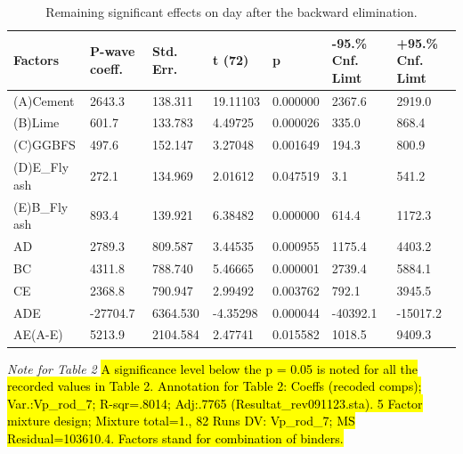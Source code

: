 \documentclass[materials,article,submit,pdftex,moreauthors]{Definitions/mdpi}
\begin{document}
\begin{table}[H]
\begin{threeparttable}
\caption{Remaining significant effects on day  after the backward elimination.}
\footnotesize
    \centering
    \begin{tabular}{|l|l|l|l|l|l|l|}
    \hline
        Factors & P-wave coeff. & Std. Err. & t (72) & p & -95.\% Cnf. Limt & +95.\% Cnf. Limt \\ \hline
        (A)Cement & 2643.3 & 138.311 & 19.11103 & 0.000000 & 2367.6 & 2919.0 \\ \hline
        (B)Lime & 601.7 & 133.783 & 4.49725 & 0.000026 & 335.0 & 868.4 \\ \hline
        (C)GGBFS & 497.6 & 152.147 & 3.27048 & 0.001649 & 194.3 & 800.9 \\ \hline
        (D)E\_Fly ash & 272.1 & 134.969 & 2.01612 & 0.047519 & 3.1 & 541.2 \\ \hline
        (E)B\_Fly ash & 893.4 & 139.921 & 6.38482 & 0.000000 & 614.4 & 1172.3 \\ \hline
        AD & 2789.3 & 809.587 & 3.44535 & 0.000955 & 1175.4 & 4403.2 \\ \hline
        BC & 4311.8 & 788.740 & 5.46665 & 0.000001 & 2739.4 & 5884.1 \\ \hline
        CE & 2368.8 & 790.947 & 2.99492 & 0.003762 & 792.1 & 3945.5 \\ \hline
        ADE & -27704.7 & 6364.530 & -4.35298 & 0.000044 & -40392.1 & -15017.2 \\ \hline
        AE(A-E) & 5213.9 & 2104.584 & 2.47741 & 0.015582 & 1018.5 & 9409.3 \\ \hline
    \end{tabular}\label{tab:2}
    \begin{tablenotes}
      \scriptsize
      	\item \emph{Note for Table 2} \hl{A significance level below the p = 0.05 is noted for all the recorded values in Table 2. Annotation for Table 2: Coeffs (recoded comps); Var.:Vp\_rod\_7; R-sqr=.8014; Adj:.7765 (Resultat\_rev091123.sta). 5 Factor mixture design; Mixture total=1., 82 Runs DV: Vp\_rod\_7; MS Residual=103610.4. Factors stand for combination of binders.}
    \end{tablenotes}
  \end{threeparttable}
\end{table}
\end{document}
